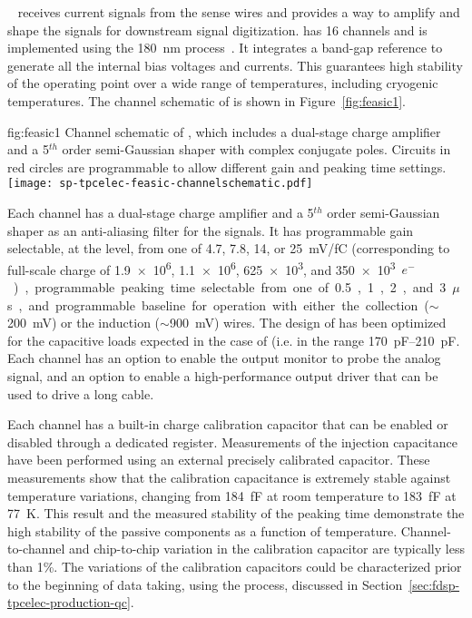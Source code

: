~\cite{DeGeronimo:2011zz} receives 
current signals from the  sense wires and provides a way to 
amplify and shape the signals for downstream signal digitization. 
 has \num{16} channels and is implemented 
using the  \SI{180}{nm}  process~\cite{TSMC180}. It 
integrates a band-gap reference to generate all the internal bias 
voltages and currents. This guarantees high stability of the operating 
point over a wide range of temperatures, including cryogenic temperatures. 
The channel schematic of  is shown in 
Figure~\ref{fig:feasic1}. 

\begin{dunefigure}
{fig:feasic1}
{Channel schematic of , which includes a 
dual-stage charge amplifier and a \num{5}$^{th}$ order semi-Gaussian 
shaper with complex conjugate poles. Circuits in red circles are 
programmable to allow different gain and peaking time settings.}
\texttt{[image: sp-tpcelec-feasic-channelschematic.pdf]}
\end{dunefigure}

Each  channel has a dual-stage charge amplifier 
and a \num{5}$^{th}$ order semi-Gaussian shaper as an anti-aliasing 
filter for the  signals. It has programmable gain 
selectable, at the  level, from one of \num{4.7}, \num{7.8}, \num{14}, or \SI{25}{mV/fC}
(corresponding to full-scale charge of \num{1.9e6}, \num{1.1e6}, \num{625e3}, 
and \SI{350e3}{$e^-$}), programmable peaking time selectable from one of 
\num{0.5}, \num{1}, \num{2}, and \SI{3}{$\mu$s}, and programmable 
baseline for operation with either the collection ($\sim$\SI{200}{mV}) 
or the induction ($\sim$\SI{900}{mV}) wires. The design of
 has been optimized for the capacitive
loads expected in the case of  (i.e. in the range \SIrange{170}{210}{pF}.
Each channel has an 
option to enable the output monitor to probe the analog signal, and 
an option to enable a high-performance output driver that can be 
used to drive a long cable. 

Each  channel has a built-in charge calibration 
capacitor that can be enabled or disabled through a dedicated register. 
Measurements of the injection capacitance have been performed using an 
external precisely calibrated capacitor. These measurements show that
the calibration capacitance is extremely stable against temperature variations, 
changing from \SI{184}{fF} at room temperature to 
\SI{183}{fF} at \SI{77}{K}. This result and the measured stability of 
the peaking time demonstrate the high stability of the passive 
components as a function of temperature. Channel-to-channel and 
chip-to-chip variation in the calibration capacitor are typically 
less than \num{1}\%. The variations of the calibration capacitors
could be characterized prior to the beginning of 
data taking, using the  process, discussed in
Section~\ref{sec:fdsp-tpcelec-production-qc}.

